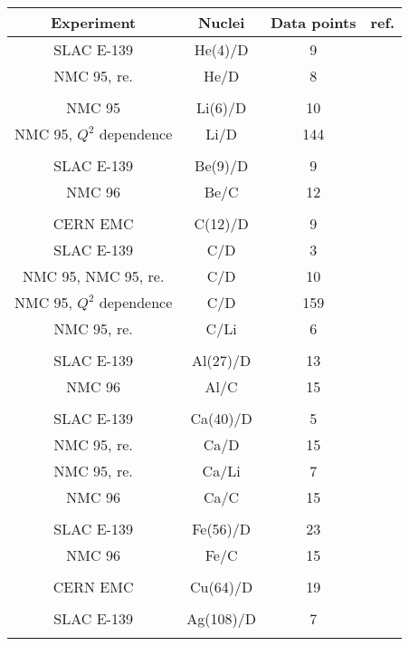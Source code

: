 \begin{table}
\centering
\begin{tabular}{c c c c}
\hline
\hline
Experiment & Nuclei & Data points & ref.\\
\hline
  SLAC E-139 & He(4)/D & 9 & \cite{PhysRevD.49.4348} \\
  NMC 95, re. & He/D & 8 & \cite{Amaudruz:1995tq}\\
\\
  NMC 95 & Li(6)/D & 10 & \cite{Arneodo:1995cs}\\
  NMC 95, $Q^2$ dependence & Li/D & 144 &\cite{Arneodo:1995cs}\\
\\
  SLAC E-139 & Be(9)/D & 9 & \cite{PhysRevD.49.4348}\\
  NMC 96 & Be/C & 12 & \cite{Arneodo:1996rv}\\
\\
  CERN EMC & C(12)/D & 9 & \cite{Ashman:1992kv}\\
  SLAC E-139 & C/D & 3 & \cite{PhysRevD.49.4348}\\
  NMC 95, NMC 95, re.  & C/D & 10 & \cite{Arneodo:1995cs,Amaudruz:1995tq}\\
  NMC 95, $Q^2$ dependence & C/D & 159 & \cite{Arneodo:1995cs}\\
  NMC 95, re. & C/Li & 6 & \cite{Amaudruz:1995tq}\\
\\
  SLAC E-139 & Al(27)/D & 13 & \cite{PhysRevD.49.4348}\\
  NMC 96 & Al/C & 15 & \cite{Arneodo:1996rv}\\
\\
  SLAC E-139 & Ca(40)/D & 5 & \cite{PhysRevD.49.4348}\\
  NMC 95, re. & Ca/D & 15 & \cite{Amaudruz:1995tq}\\
  NMC 95, re. & Ca/Li & 7 & \cite{Amaudruz:1995tq}\\
  NMC 96 & Ca/C & 15 & \cite{Arneodo:1996rv}\\
\\
  SLAC E-139 & Fe(56)/D & 23 & \cite{PhysRevD.49.4348}\\
  NMC 96 & Fe/C & 15 & \cite{Arneodo:1996rv}\\
\\
  CERN EMC & Cu(64)/D & 19 & \cite{Ashman:1992kv}\\
\\
  SLAC E-139 & Ag(108)/D & 7 & \cite{PhysRevD.49.4348}\\
\\

\end{tabular}
\end{table}
